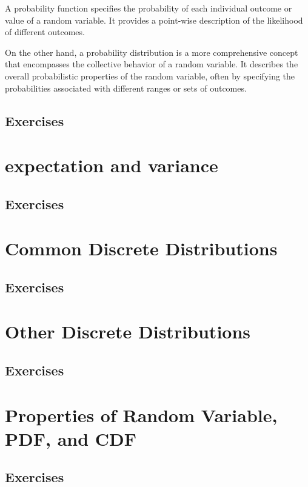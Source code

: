 A probability function specifies the probability of each individual outcome or value of a random variable. It provides a point-wise description of the likelihood of different outcomes.

On the other hand, a probability distribution is a more comprehensive concept that encompasses the collective behavior of a random variable. It describes the overall probabilistic properties of the random variable, often by specifying the probabilities associated with different ranges or sets of outcomes.



\subsection{Exercises}

\section{expectation and variance}

\subsection{Exercises}

\section{Common Discrete Distributions}
\subsection{Exercises}

\section{Other Discrete Distributions}
\subsection{Exercises}

\section{Properties of Random Variable, PDF, and CDF}
\subsection{Exercises}



